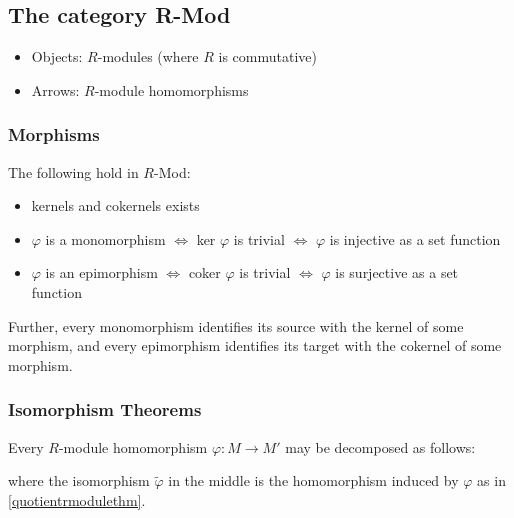 \subsection{The category R-Mod}
\begin{itemize}
  \item Objects: $R$-modules (where $R$ is commutative)
  \item Arrows: $R$-module homomorphisms
\end{itemize}

\subsubsection{Morphisms}

\begin{proposition}
The following hold in $R$-Mod:
\begin{itemize}
  \item kernels and cokernels exists
  \item $\varphi$ is a monomorphism $\Leftrightarrow$ ker $\varphi$ is trivial $\Leftrightarrow$ $\varphi$ is injective as a set function
  \item $\varphi$ is an epimorphism $\Leftrightarrow$ coker $\varphi$ is trivial $\Leftrightarrow$ $\varphi$ is surjective as a set function
\end{itemize}
\noindent Further, every monomorphism identifies its source with the kernel of some morphism, and every epimorphism identifies its target
with the cokernel of some morphism.
\end{proposition}

\subsubsection{Isomorphism Theorems}\label{rmoduleisomorphismtheorems}

\begin{theorem}
\label{rmodulecanonicaldecomposition}
Every $R$-module homomorphism $\varphi : M \rightarrow M'$ may be decomposed as follows:

\begin{figure}[H]
  \centering
  
\end{figure}

\noindent where the isomorphism $\tilde \varphi$ in the middle is the homomorphism induced by $\varphi$ as in \ref{quotientrmodulethm}.
\end{theorem}


